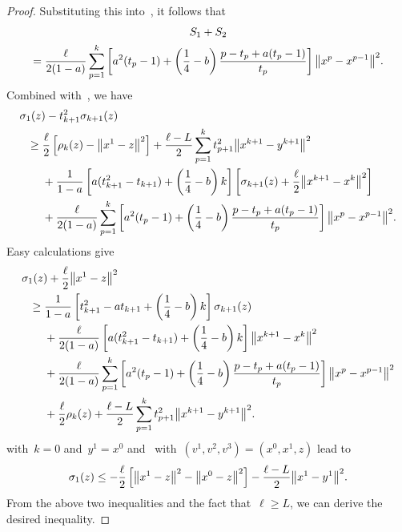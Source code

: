 \documentclass[../main]{subfiles}
\begin{document}
\begin{proof}
    Substituting this into~, it follows that
    \begin{multline}
        S_1 + S_2 \\
        = \frac{\ell}{2 (1 - a)} \sum_{p = 1}^{k} \left[ a^2 (t_p - 1) + \left( \frac{1}{4} - b \right) \frac{p - t_p + a (t_p - 1)}{t_p} \right] \norm*{x^p - x^{p - 1}}^2
    .\end{multline}
    Combined with~, we have
    \begin{align}
        \MoveEqLeft \sigma_1(z) - t_{k + 1}^2 \sigma_{k + 1}(z) \\
        \ge{}& \frac{\ell}{2} \left[ \rho_k(z) - \norm*{x^1 - z}^2 \right] + \frac{\ell - L}{2} \sum_{p = 1}^{k} t_{p + 1}^2 \norm*{x^{k + 1} - y^{k + 1}}^2 \\
             &+ \frac{1}{1 - a} \left[ a (t_{k + 1}^2 - t_{k + 1}) + \left( \frac{1}{4} - b \right) k \right] \left[ \sigma_{k + 1}(z) + \frac{\ell}{2} \norm*{x^{k + 1} - x^k}^2 \right] \\
             &+ \frac{\ell}{2 (1 - a)} \sum_{p = 1}^{k} \left[ a^2 (t_p - 1) + \left( \frac{1}{4} - b \right) \frac{p - t_p + a (t_p - 1)}{t_p} \right] \norm*{x^p - x^{p - 1}}^2
    .\end{align}
    Easy calculations give
    \begin{align}
        \MoveEqLeft \sigma_1(z) + \frac{\ell}{2} \norm*{x^1 - z}^2 \\
        \ge{}& \frac{1}{1 - a} \left[ t_{k + 1}^2 - a t_{k + 1} + \left( \frac{1}{4} - b \right) k \right] \sigma_{k + 1}(z) \\
        &+ \frac{\ell}{2 (1 - a)} \left[ a (t_{k + 1}^2 - t_{k + 1}) + \left( \frac{1}{4} - b \right) k \right] \norm*{x^{k + 1} - x^k}^2 \\
        &+ \frac{\ell}{2 (1 - a)} \sum_{p = 1}^{k} \left[ a^2 (t_p - 1) + \left( \frac{1}{4} - b \right) \frac{p - t_p + a(t_p - 1)}{t_p} \right] \norm*{x^p - x^{p - 1}}^2 \\
        &+ \frac{\ell}{2} \rho_k(z) + \frac{\ell - L}{2} \sum_{p = 1}^{k} t_{p + 1}^2 \norm*{x^{k + 1} - y^{k + 1}}^2
    .\end{align}
     with~$k = 0$ and~$y^1 = x^0$ and~ with~$(v^1, v^2, v^3) = (x^0, x^1, z)$ lead to
    \begin{equation}
        \sigma_1(z) \le - \frac{\ell}{2} \left[ \norm*{x^1 - z}^2 - \norm*{x^0 - z}^2 \right] - \frac{\ell - L}{2} \norm*{x^1 - y^1}^2
    .\end{equation}
    From the above two inequalities and the fact that~$\ell \ge L$, we can derive the desired inequality.
\end{proof}
\end{document}
